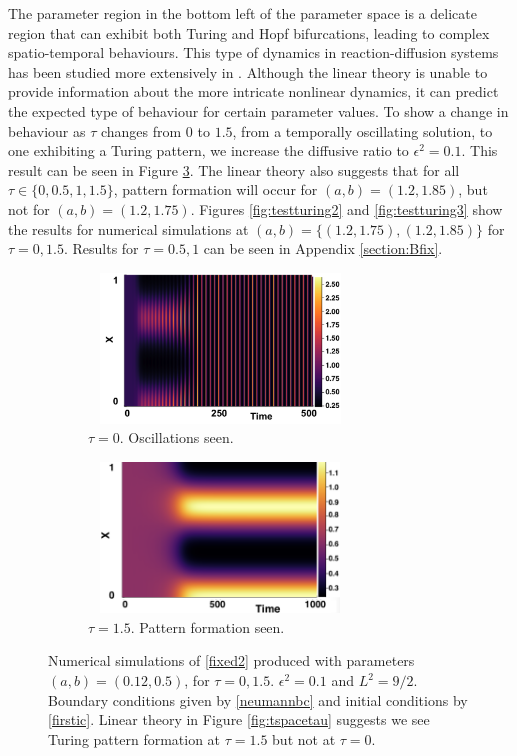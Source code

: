 The parameter region in the bottom left of the parameter space is a delicate region that can exhibit both Turing and Hopf bifurcations, leading to complex spatio-temporal behaviours. This type of dynamics in reaction-diffusion systems has been studied more extensively in \cite{krausefixed,jiang}. Although the linear theory is unable to provide information about the more intricate nonlinear dynamics, it can predict the expected type of behaviour for certain parameter values. To show a change in behaviour as $\tau$ changes from $0$ to $1.5$, from a temporally oscillating solution, to one exhibiting a Turing pattern, we increase the diffusive ratio to $\epsilon^2=0.1$. This result can be seen in Figure \ref{fig:testturing}. The linear theory also suggests that for all $\tau\in\{0,0.5,1,1.5\}$, pattern formation will occur for $(a,b)=(1.2,1.85)$, but not for $(a,b)=(1.2,1.75)$. Figures \ref{fig:testturing2} and \ref{fig:testturing3} show the results for numerical simulations at $(a,b)=\{(1.2,1.75),(1.2,1.85)\}$ for $\tau=0,1.5$. Results for $\tau=0.5,1$ can be seen in Appendix \ref{section:Bfix}.
\begin{figure}[h]
    \centering
    \begin{subfigure}[t]{0.45\textwidth}
        \centering
        \includegraphics[width=7cm,height=4cm]{toscill.png}
        \caption{$\tau=0$. Oscillations seen.}
        \label{}
    \end{subfigure}
    \hfill
    \begin{subfigure}[t]{0.45\textwidth}
        \centering
        \includegraphics[width=7cm,height=4cm]{tpattpred.png}
        \caption{$\tau=1.5$. Pattern formation seen.}
        \label{}
    \end{subfigure}
    \caption{Numerical simulations of \eqref{fixed2} produced with parameters $(a,b)=(0.12,0.5)$, for $\tau=0,1.5$. $\epsilon^2=0.1$ and $L^2=9/2$. Boundary conditions given by \eqref{neumannbc} and initial conditions by \eqref{firstic}. Linear theory in Figure \ref{fig:tspacetau} suggests we see Turing pattern formation at $\tau=1.5$ but not at $\tau=0$.}
    \label{fig:testturing}
\end{figure}

